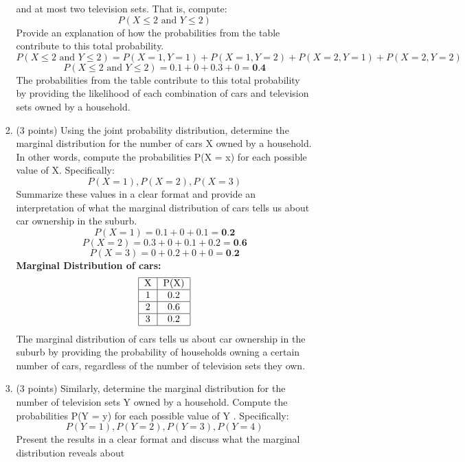 \documentclass[a3paper,12pt]{article} %
\begin{document}
\begin{enumerate}
\begin{enumerate}
\begin{enumerate}
        and at most two television sets. That is, compute:
        \[
            P(X \leq 2 \text{ and } Y \leq 2)
        \]
        Provide an explanation of how the probabilities from the table contribute to this total probability.
        \[
            P(X \leq 2 \text{ and } Y \leq 2) = P(X = 1, Y = 1) + P(X = 1, Y = 2) + P(X = 2, Y = 1) + P(X = 2, Y = 2)
        \]
        \[
            P(X \leq 2 \text{ and } Y \leq 2) = 0.1 + 0 + 0.3 + 0 = \textbf{0.4}
        \]
        The probabilities from the table contribute to this total probability by providing the likelihood of each combination of cars and television sets owned by a household.
        \item (3 points) Using the joint probability distribution, determine the marginal distribution
        for the number of cars X owned by a household. In other words, compute the probabilities
        P(X = x) for each possible value of X. Specifically:
        \[
            P(X = 1), P(X = 2), P(X = 3)
        \]
        Summarize these values in a clear format and provide an interpretation of what the marginal
        distribution of cars tells us about car ownership in the suburb.
        \[
            P(X = 1) = 0.1 + 0 + 0.1 = \textbf{0.2}
        \]
        \[
            P(X = 2) = 0.3 + 0 + 0.1 + 0.2 = \textbf{0.6}
        \]
        \[
            P(X = 3) = 0 + 0.2 + 0 + 0 = \textbf{0.2}
        \]
        \textbf{Marginal Distribution of cars:}
        \[
            \begin{tabular}{|c|c|}
                \hline
                X & P(X) \\
                \hline
                1 & 0.2 \\
                \hline
                2 & 0.6 \\
                \hline
                3 & 0.2 \\
                \hline
            \end{tabular}
        \]
        The marginal distribution of cars tells us about car ownership in the suburb by providing the probability of households owning a certain number of cars, regardless of the number of television sets they own.
        \item (3 points) Similarly, determine the marginal distribution for the number of television sets
        Y owned by a household. Compute the probabilities P(Y = y) for each possible value of Y .
        Specifically:
        \[
            P(Y = 1), P(Y = 2), P(Y = 3), P(Y = 4)
        \]
        Present the results in a clear format and discuss what the marginal distribution reveals about

\end{enumerate}
\end{enumerate}
\end{enumerate}
\end{document}
